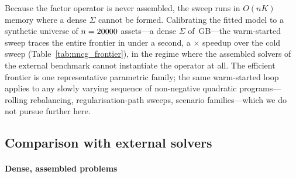 
Because the factor operator is never assembled, the
sweep runs in $O(nK)$ memory where a dense $\Sigma$ cannot be formed. Calibrating the fitted
model to a synthetic universe of $n = 20000{}$ assets---a dense $\Sigma$ of
\nncgFrontMaxGB{}\,GB---the warm-started sweep traces the entire frontier in under a second, a
\nncgFrontMaxX{}$\times$ speedup over the cold sweep (Table~\ref{tab:nncg_frontier}), in the
regime where the assembled solvers of the external benchmark cannot instantiate the operator at
all. The efficient frontier is one representative parametric family; the same warm-started loop
applies to any slowly varying sequence of non-negative quadratic programs---rolling
rebalancing, regularisation-path sweeps, scenario families---which we do not pursue further
here.

\begin{table}[ht]
\centering
\footnotesize

\caption{Warm-started matrix-free frontier on a calibrated factor universe: cold versus
warm-started wall-clock (s) for the whole \nncgFrontGammas{}-point sweep against problem size
$n$, with the storage a dense $\Sigma$ would need but the factor operator never forms. Applied
in $O(nK)$; the direct solvers of the external benchmark cannot factorise $\Sigma$ at these
sizes.}
\label{tab:nncg_frontier}
\end{table}

\subsection{Comparison with external solvers}\label{ssec:external}
\paragraph{Dense, assembled problems}

